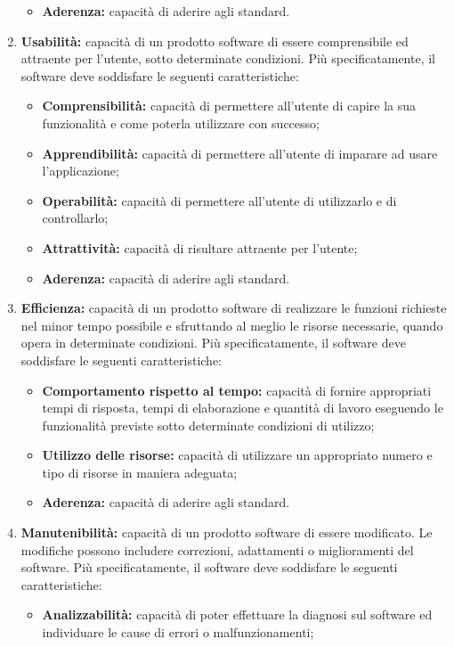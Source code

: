 \begin{enumerate}
\begin{itemize}
 		\item \textbf{Aderenza:} capacità di aderire agli standard.
 	\end{itemize}
 	\item \textbf{Usabilità:} capacità di un prodotto software di essere comprensibile ed attraente per l’utente, sotto determinate condizioni. Più specificatamente, il software deve soddisfare le seguenti caratteristiche:
 	\begin{itemize}
 		\item \textbf{Comprensibilità:} capacità di permettere all'utente di capire la sua funzionalità e come poterla utilizzare con successo;
 		\item \textbf{Apprendibilità:} capacità di permettere all'utente di imparare ad usare l’applicazione;
 		\item \textbf{Operabilità:} capacità di permettere all'utente di utilizzarlo e di controllarlo;
 		\item \textbf{Attrattività:} capacità di risultare attraente per l’utente;
 		\item \textbf{Aderenza:} capacità di aderire agli standard.
 	\end{itemize}
 	\item \textbf{Efficienza:} capacità di un prodotto software di realizzare le funzioni richieste nel minor tempo possibile e sfruttando al meglio le risorse necessarie, quando opera in determinate condizioni. Più specificatamente, il software deve soddisfare le seguenti caratteristiche:
 	\begin{itemize}
 		\item \textbf{Comportamento rispetto al tempo:} capacità di fornire appropriati tempi di risposta, tempi di elaborazione e quantità di lavoro eseguendo le funzionalità previste sotto determinate condizioni di utilizzo;
 		\item \textbf{Utilizzo delle risorse:} capacità di utilizzare un appropriato numero e tipo di risorse in maniera adeguata;
 		\item \textbf{Aderenza:} capacità di aderire agli standard.
 	\end{itemize}
 	\item \textbf{Manutenibilità:} capacità di un prodotto software di essere modificato. Le modifiche possono includere correzioni, adattamenti o miglioramenti del software. Più specificatamente, il software deve soddisfare le seguenti caratteristiche:
 	\begin{itemize}
 		\item \textbf{Analizzabilità:} capacità di poter effettuare la diagnosi sul software ed individuare le cause di errori o malfunzionamenti;

\end{itemize}
\end{enumerate}
